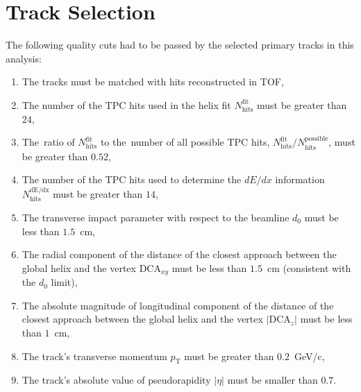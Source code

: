 \section{Track Selection}\label{section:star_track_selection}
The following quality cuts had to be passed by the selected primary tracks in this analysis:
\begin{enumerate}
	\item The tracks must be matched with hits reconstructed in TOF,
	\item The number of the  TPC hits used in the helix fit $N_{\textrm{hits}}^{\textrm{fit}}$ must be greater than $24$,
	\item The~ratio of $N_{\textrm{hits}}^{\textrm{fit}}$ to the~number of all possible TPC hits, $N_{\textrm{hits}}^{\textrm{fit}}/N_{\textrm{hits}}^{\textrm{possible}}$, must be greater than $0.52$,
	\item The number of the  TPC hits used to determine the $dE/dx$ information $N_{\textrm{hits}}^{\textrm{dE/dx}}$ must be greater than $14$,
	\item The transverse impact parameter with respect to the beamline $d_0$ must be less than $1.5$~cm,
	\item The radial component of the distance of the closest approach between  the global helix and the vertex $\textrm{DCA}_{xy}$ must be less than $1.5$~cm (consistent with the $d_0$ limit),
	\item The absolute magnitude of  longitudinal component of the distance of the closest approach between  the global helix and the vertex $|\textrm{DCA}_{z}|$ must be less than $1$~cm,
	\item The track's transverse momentum $p_\textrm{T}$ must be greater than $0.2$~GeV/c,
	\item The track's absolute value of  pseudorapidity $|\eta|$ must be smaller than $0.7$.
\end{enumerate}

